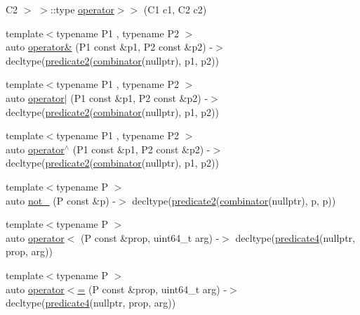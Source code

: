 \begin{DoxyCompactItemize}
C2 $>$ $>$\+::type \hyperlink{namespacepfq__lang_a4c0690ecb14af669a41969a5de14acad}{operator$>$$>$} (C1 c1, C2 c2)
\item 
{\footnotesize template$<$typename P1 , typename P2 $>$ }\\auto \hyperlink{namespacepfq__lang_aa6f7aa80466e4cfd61a341fcf7a2eda4}{operator\&} (P1 const \&p1, P2 const \&p2) -\/$>$ decltype(\hyperlink{namespacepfq__lang_a89ea436faf8b7f13512e07efbce83b41}{predicate2}(\hyperlink{namespacepfq__lang_a35f3de0a6684c64d0465aa3f263fa8a6}{combinator}(nullptr), p1, p2))
\item 
{\footnotesize template$<$typename P1 , typename P2 $>$ }\\auto \hyperlink{namespacepfq__lang_adeec773d44aae2b2f2957e1498c4ce8f}{operator$\vert$} (P1 const \&p1, P2 const \&p2) -\/$>$ decltype(\hyperlink{namespacepfq__lang_a89ea436faf8b7f13512e07efbce83b41}{predicate2}(\hyperlink{namespacepfq__lang_a35f3de0a6684c64d0465aa3f263fa8a6}{combinator}(nullptr), p1, p2))
\item 
{\footnotesize template$<$typename P1 , typename P2 $>$ }\\auto \hyperlink{namespacepfq__lang_a29166c6bb957d6edd6892b7081f574df}{operator$^\wedge$} (P1 const \&p1, P2 const \&p2) -\/$>$ decltype(\hyperlink{namespacepfq__lang_a89ea436faf8b7f13512e07efbce83b41}{predicate2}(\hyperlink{namespacepfq__lang_a35f3de0a6684c64d0465aa3f263fa8a6}{combinator}(nullptr), p1, p2))
\item 
{\footnotesize template$<$typename P $>$ }\\auto \hyperlink{namespacepfq__lang_a3a284611cc2c705d4304ba5e0f45d8b7}{not\+\_\+} (P const \&p) -\/$>$ decltype(\hyperlink{namespacepfq__lang_a89ea436faf8b7f13512e07efbce83b41}{predicate2}(\hyperlink{namespacepfq__lang_a35f3de0a6684c64d0465aa3f263fa8a6}{combinator}(nullptr), p, p))
\item 
{\footnotesize template$<$typename P $>$ }\\auto \hyperlink{namespacepfq__lang_a222bd443a88e69ec2b3acd886bb80e37}{operator$<$} (P const \&prop, uint64\+\_\+t arg) -\/$>$ decltype(\hyperlink{namespacepfq__lang_a1a9064340f4197e3dd4109a849a224dc}{predicate4}(nullptr, prop, arg))
\item 
{\footnotesize template$<$typename P $>$ }\\auto \hyperlink{namespacepfq__lang_a67b8e80010c51a199869c1c2368b87be}{operator$<$=} (P const \&prop, uint64\+\_\+t arg) -\/$>$ decltype(\hyperlink{namespacepfq__lang_a1a9064340f4197e3dd4109a849a224dc}{predicate4}(nullptr, prop, arg))

\end{DoxyCompactItemize}
